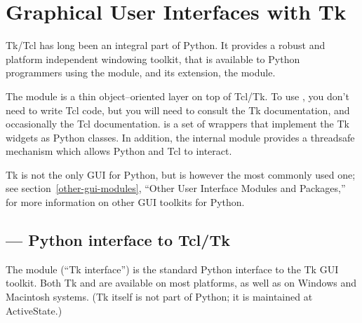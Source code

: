 \chapter{Graphical User Interfaces with Tk \label{tkinter}}


Tk/Tcl has long been an integral part of Python.  It provides a robust
and platform independent windowing toolkit, that is available to
Python programmers using the  module, and its
extension, the  module.

The  module is a thin object--oriented layer on top of
Tcl/Tk. To use , you don't need to write Tcl code,
but you will need to consult the Tk documentation, and occasionally
the Tcl documentation.   is a set of wrappers that
implement the Tk widgets as Python classes.  In addition, the internal
module  provides a threadsafe mechanism which allows
Python and Tcl to interact.

Tk is not the only GUI for Python, but is however the most commonly
used one; see section~\ref{other-gui-modules}, ``Other User Interface
Modules and Packages,'' for more information on other GUI toolkits for
Python.


\localmoduletable


\section{ ---
         Python interface to Tcl/Tk}


The  module (``Tk interface'') is the standard Python
interface to the Tk GUI toolkit.  Both Tk and  are
available on most \UNIX{} platforms, as well as on Windows and
Macintosh systems.  (Tk itself is not part of Python; it is maintained
at ActiveState.)

